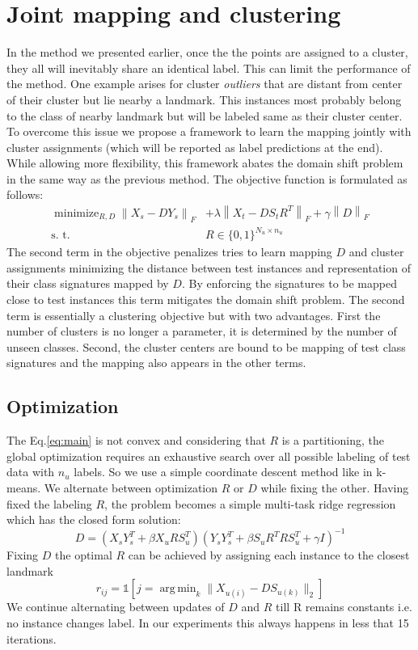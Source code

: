 \documentclass[10pt,twocolumn,letterpaper]{article}
\newcommand{\norm}[1]{\left \lVert #1 \right \rVert_{F}}
\DeclareMathOperator*{\argmin}{arg\,min}
\DeclareMathOperator*{\minimize}{minimize}
\begin{document}
\section{Joint mapping and clustering}
\label{joint}
In the method we presented earlier, once the the points are assigned to a cluster,
they all will inevitably share an identical label. This can limit the performance of the method. One
example arises for cluster \textit{outliers} that are distant from center of their cluster but lie
nearby a landmark. This instances most probably belong to the class of nearby landmark but will be labeled same
as their cluster center. To overcome this issue we propose a framework to learn the mapping jointly with cluster assignments
 (which will be reported as label predictions at the end).
 While allowing more flexibility, this framework abates the domain shift problem in the same way as the previous method.
 The objective function is formulated as follows:
 \begin{align} \label{eq:main}
   \minimize_{R,D} \norm{X_s - D Y_s}  &+ \lambda \norm{X_t - D S_t R^T } + \gamma \norm{D} \\
   \text{s. t.} \quad & R \in \{0,1\}^{N_u \times n_u}
 \end{align}
 The second term in the objective penalizes tries to learn mapping $D$ and cluster assignments minimizing the
 distance between test instances and representation of their class signatures mapped by $D$. By enforcing
 the signatures to be mapped close to test instances this term mitigates the domain shift problem.
 The second term is essentially a clustering objective but with two advantages. First the number of clusters is no longer a
 parameter, it is determined by the number of unseen classes. Second, the cluster centers are bound to be
 mapping of test class signatures and the mapping also appears in the other terms.

\subsection{Optimization}
The Eq.\eqref{eq:main} is not convex and considering that $R$ is a partitioning, the global optimization requires an
exhaustive search over all possible labeling of test data with $n_u$ labels. So we use a simple coordinate descent
method like in k-means. We alternate between optimization $R$ or $D$ while fixing the other.
Having fixed the labeling $R$, the problem becomes a simple multi-task ridge regression which has the closed form solution:
\begin{equation} \label{eq:d_update}
  D = (X_s Y_s^T + \beta X_u R S_u^T) (Y_s Y_s^T + \beta S_u R^T R S_u^T  + \gamma I)^{-1}
\end{equation}
Fixing $D$ the optimal $R$ can be achieved by assigning each instance to the closest landmark
\begin{equation} \label{eq:r_update}
  r_{ij} = \mathds{1}[j = \argmin_{k} \lVert X_{u(i)} - D S_{u(k)} \rVert_2 ]
\end{equation}
We continue alternating between updates of $D$ and $R$ till R remains constants i.e. no instance changes label. In our experiments this always happens
in less that 15 iterations.
\end{document}
